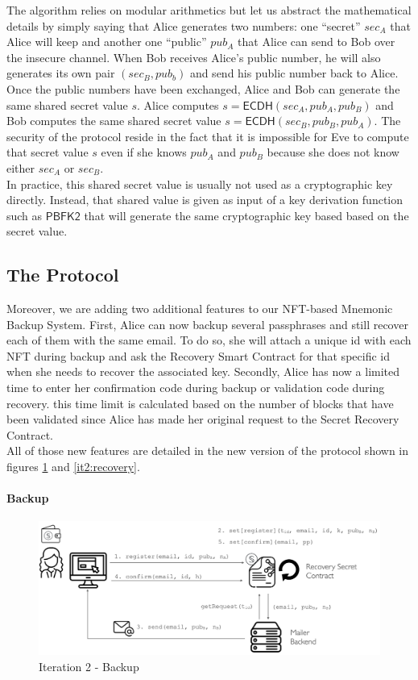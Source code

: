 \documentclass[12pt]{article}
\newcommand{\ms}[1]{\ensuremath{\mathsf{#1}}}
\begin{document}
The algorithm relies on modular arithmetics but let us abstract the mathematical details by simply saying that Alice generates two numbers: one ``secret'' $sec_A$ that Alice will keep and another one ``public'' $pub_A$ that Alice can send to Bob over the insecure channel. When Bob receives Alice's public number, he will also generates its own pair $(sec_B, pub_b)$ and send his public number back to Alice. Once the public numbers have been exchanged, Alice and Bob can generate the same shared secret value $s$. Alice computes $s=\ms{ECDH}(sec_A, pub_A, pub_B)$ and Bob computes the same shared secret value $s=\ms{ECDH}(sec_B, pub_B, pub_A)$. The security of the protocol reside in the fact that it is impossible for Eve to compute that secret value $s$ even if she knows $pub_A$ and $pub_B$ because she does not know either $sec_A$ or $sec_B$. \\

In practice, this shared secret value is usually not used as a cryptographic key directly. Instead, that shared value is given as input of a key derivation function such as $\ms{PBFK2}$ that will generate the same cryptographic key based based on the secret value. 

\subsection{The Protocol}

Moreover, we are adding two additional features to our NFT-based Mnemonic Backup System. First, Alice can now backup several passphrases and still recover each of them with the same email. To do so, she will attach a unique id with each NFT during backup and ask the Recovery Smart Contract for that specific id when she needs to recover the associated key. Secondly, Alice has now a limited time to enter her confirmation code during backup or validation code during recovery. this time limit is calculated based on the number of blocks that have been validated since Alice has made her original request to the Secret Recovery Contract. \\

All of those new features are detailed in the new version of the protocol shown in figures \ref{it2:backup} and \ref{it2:recovery}.

\paragraph{Backup}

\begin{figure}
  \includegraphics[width=\linewidth]{./media/media-003.png}
  \caption{Iteration 2 - Backup}
  \label{it2:backup}
\end{figure}
\end{document}
